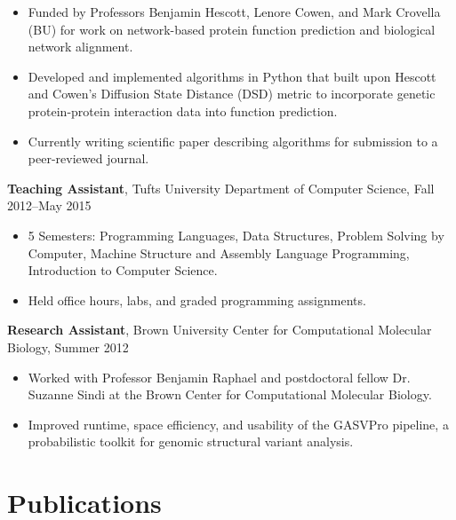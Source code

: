 \documentclass[10pt, letter]{article}
\begin{document}
\vspace*{-.15in} 
\begin{itemize}[topsep=0pt,itemsep=-1pt]
    \item Funded by Professors Benjamin Hescott, Lenore Cowen, and Mark Crovella (BU) for work on network-based protein function prediction and biological network alignment.
    \item Developed and implemented algorithms in Python that built upon Hescott and Cowen's Diffusion State Distance (DSD) metric to incorporate genetic protein-protein interaction data into function prediction.
    \item Currently writing scientific paper describing algorithms for submission to a peer-reviewed journal.
\end{itemize}
\vspace{6pt}
{\bf Teaching Assistant}, {Tufts University Department of Computer Science}, Fall 2012--May 2015\\
\vspace*{-.15in}
\begin{itemize}[topsep=0pt,itemsep=-1pt]
  \item 5 Semesters: Programming Languages, Data Structures, Problem Solving by Computer, Machine Structure and Assembly Language Programming, Introduction to Computer Science.
  \item Held office hours, labs, and graded programming assignments.
\end{itemize}
\vspace{6pt}
{\bf Research Assistant}, {Brown University Center for Computational Molecular Biology}, Summer 2012\\
\vspace*{-.15in}
\begin{itemize}[topsep=0pt,itemsep=-1pt]
\item Worked with Professor Benjamin Raphael and postdoctoral fellow Dr. Suzanne Sindi at the Brown Center for Computational Molecular Biology.
\item Improved runtime, space efficiency, and usability of the GASVPro pipeline, a probabilistic toolkit for genomic structural variant analysis.
\end{itemize}

\section* {Publications}
\end{document}
